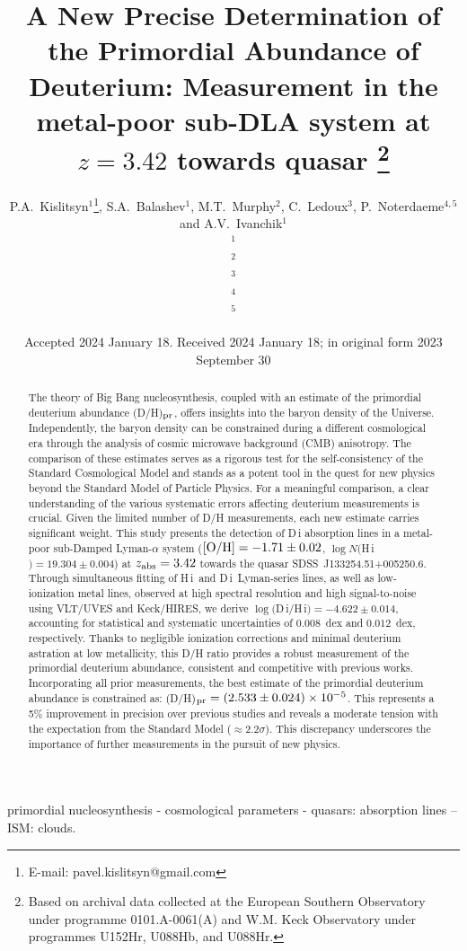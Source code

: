 \documentclass[fleqn,usenatbib]{mnras}
\title[A New Precise Determination of the Primordial Abundance of Deuterium.]{A New Precise Determination of the Primordial Abundance of Deuterium:
Measurement in the metal-poor sub-DLA system at $z=3.42$ towards quasar \q\thanks{Based on archival data collected at the European Southern Observatory under programme 0101.A-0061(A)
and W.M. Keck Observatory under programmes U152Hr, U088Hb, and U088Hr.}
}
\author[Kislitsyn P. et al.]{
P.A.~Kislitsyn$^{1}$\thanks{E-mail: pavel.kislitsyn@gmail.com},
S.A.~Balashev$^{1}$,
M.T.~Murphy$^{2}$,
C.~Ledoux$^{3}$,
P.~Noterdaeme$^{4,5}$
and A.V.~Ivanchik$^{1}$
\\
$^{1}$ \ioffe \\
$^{2}$ \sut \\
$^{3}$ \eso \\
$^{4}$ \fcla \\
$^{5}$ \iap \\
}
\date{Accepted 2024 January 18. Received 2024 January 18; in original form 2023 September 30}
\newcommand{\DI}[0]{D\,{\sc i}}
\newcommand{\HI}[0]{H\,{\sc i}}
\newcommand{\ql}{SDSS~J133254.51+005250.6}
\begin{document}
\label{firstpage}
\pagerange{\pageref{firstpage}--\pageref{lastpage}}
\maketitle

\begin{abstract}

The theory of Big Bang nucleosynthesis, coupled with an estimate of the primordial deuterium abundance (D/H)$_{\rm pr}$, offers insights into the baryon density of the Universe. Independently, the baryon density can be constrained during a different cosmological era through the analysis of cosmic microwave background (CMB) anisotropy. The comparison of these estimates serves as a rigorous test for the self-consistency of the Standard Cosmological Model and stands as a potent tool in the quest for new physics beyond the Standard Model of Particle Physics.
For a meaningful comparison, a clear understanding of the various systematic errors affecting deuterium measurements is crucial. Given the limited number of D/H measurements, each new estimate carries significant weight. This study presents the detection of D\,{\sc i} absorption lines in a metal-poor sub-Damped Lyman-$\alpha$ system ($\rm [O/H]=-1.71\pm 0.02$, $\log N($\HI$)=19.304\pm 0.004$) at $z_{\rm abs}=3.42$ towards the quasar \ql. Through simultaneous fitting of \HI\ and \DI\ Lyman-series lines, as well as low-ionization metal lines, observed at high spectral resolution and high signal-to-noise using VLT/UVES and Keck/HIRES, we derive $\log($\DI/\HI$)=-4.622\pm 0.014$, accounting for statistical and systematic uncertainties of $0.008$~dex and $0.012$~dex, respectively.
Thanks to negligible ionization corrections and minimal deuterium astration at low metallicity, this D/H ratio provides a robust measurement of the primordial deuterium abundance, consistent and competitive with previous works. Incorporating all prior measurements, the best estimate of the primordial deuterium abundance is constrained as: (D/H)$_{\rm pr}=(2.533\pm 0.024)\times 10^{-5}$. This represents a 5\% improvement in precision over previous studies and reveals a moderate tension with the expectation from the Standard Model ($\approx$2.2$\sigma$). This discrepancy underscores the importance of further measurements in the pursuit of new physics.
\end{abstract}

\begin{keywords}
primordial nucleosynthesis - cosmological parameters - quasars: absorption lines – ISM: clouds.
\end{keywords}
\end{document}
